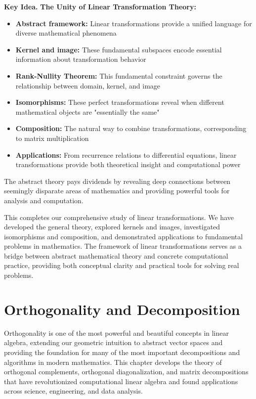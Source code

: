 \documentclass[12pt]{article}
\numberwithin{equation}{section}
\theoremstyle{plain}
\theoremstyle{definition}
\theoremstyle{remark}
\newenvironment{keyidea}{\begin{tcolorbox}\textbf{Key Idea.}}{\end{tcolorbox}}
\begin{document}
\begin{keyidea}
\textbf{The Unity of Linear Transformation Theory:}
\begin{itemize}
\item \textbf{Abstract framework:} Linear transformations provide a unified language for diverse mathematical phenomena
\item \textbf{Kernel and image:} These fundamental subspaces encode essential information about transformation behavior
\item \textbf{Rank-Nullity Theorem:} This fundamental constraint governs the relationship between domain, kernel, and image
\item \textbf{Isomorphisms:} These perfect transformations reveal when different mathematical objects are "essentially the same"
\item \textbf{Composition:} The natural way to combine transformations, corresponding to matrix multiplication
\item \textbf{Applications:} From recurrence relations to differential equations, linear transformations provide both theoretical insight and computational power
\end{itemize}

The abstract theory pays dividends by revealing deep connections between seemingly disparate areas of mathematics and providing powerful tools for analysis and computation.
\end{keyidea}

This completes our comprehensive study of linear transformations. We have developed the general theory, explored kernels and images, investigated isomorphisms and composition, and demonstrated applications to fundamental problems in mathematics. The framework of linear transformations serves as a bridge between abstract mathematical theory and concrete computational practice, providing both conceptual clarity and practical tools for solving real problems.

\newpage
\section{Orthogonality and Decomposition}

Orthogonality is one of the most powerful and beautiful concepts in linear algebra, extending our geometric intuition to abstract vector spaces and providing the foundation for many of the most important decompositions and algorithms in modern mathematics. This chapter develops the theory of orthogonal complements, orthogonal diagonalization, and matrix decompositions that have revolutionized computational linear algebra and found applications across science, engineering, and data analysis.
\end{document}
